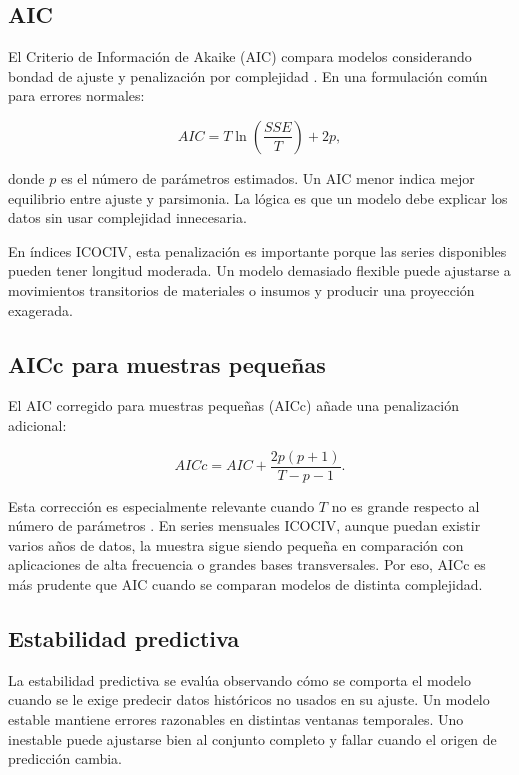 \subsection{AIC}

El Criterio de Información de Akaike (AIC) compara modelos considerando bondad de ajuste y penalización por complejidad \parencite{hyndman2021fpp3}. En una formulación común para errores normales:

\begin{equation}
    AIC = T \ln\left(\frac{SSE}{T}\right) + 2p,
    \label{eq:aic}
\end{equation}

donde \(p\) es el número de parámetros estimados. Un AIC menor indica mejor equilibrio entre ajuste y parsimonia. La lógica es que un modelo debe explicar los datos sin usar complejidad innecesaria.

En índices ICOCIV, esta penalización es importante porque las series disponibles pueden tener longitud moderada. Un modelo demasiado flexible puede ajustarse a movimientos transitorios de materiales o insumos y producir una proyección exagerada.

\subsection{AICc para muestras pequeñas}

El AIC corregido para muestras pequeñas (AICc) añade una penalización adicional:

\begin{equation}
    AICc = AIC + \frac{2p(p+1)}{T-p-1}.
    \label{eq:aicc}
\end{equation}

Esta corrección es especialmente relevante cuando \(T\) no es grande respecto al número de parámetros \parencite{hyndman_khandakar2008,hyndman2021fpp3}. En series mensuales ICOCIV, aunque puedan existir varios años de datos, la muestra sigue siendo pequeña en comparación con aplicaciones de alta frecuencia o grandes bases transversales. Por eso, AICc es más prudente que AIC cuando se comparan modelos de distinta complejidad.

\subsection{Estabilidad predictiva}

La estabilidad predictiva se evalúa observando cómo se comporta el modelo cuando se le exige predecir datos históricos no usados en su ajuste. Un modelo estable mantiene errores razonables en distintas ventanas temporales. Uno inestable puede ajustarse bien al conjunto completo y fallar cuando el origen de predicción cambia.

